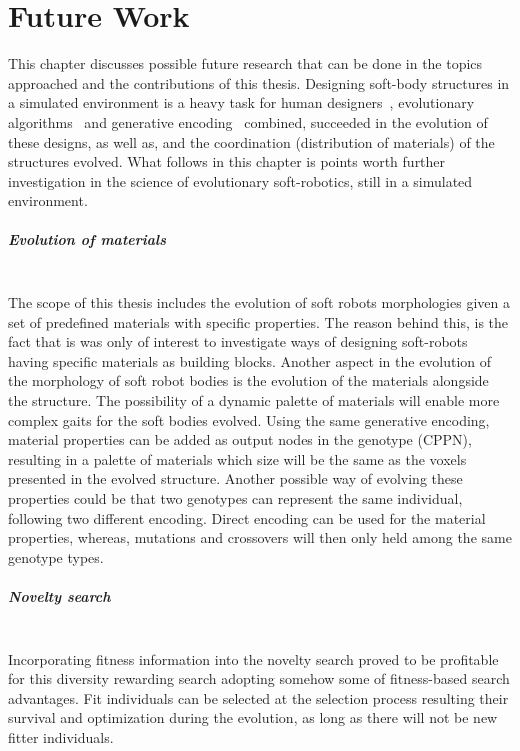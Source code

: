 
\chapter{Future Work} %

\label{Future Work} %


This chapter discusses possible future research that can be done in the topics approached and the contributions of this thesis. Designing soft-body structures in a simulated environment is a heavy task for human designers~\cite{cheney2013unshackling}, evolutionary algorithms~\cite{stanley2002evolving} and generative encoding~\cite{stanley2007compositional} combined, succeeded in the evolution of these designs, as well as, and the coordination (distribution of materials) of the structures evolved. What follows in this chapter is points worth further investigation in the science of evolutionary soft-robotics, still in a simulated environment.

\paragraph*{Evolution of materials}~\\
The scope of this thesis includes the evolution of soft robots morphologies given a set of predefined materials with specific properties. The reason behind this, is the fact that is was only of interest to investigate ways of designing soft-robots having specific materials as building blocks. Another aspect in the evolution of the morphology of soft robot bodies is the evolution of the materials alongside the structure. The possibility of a dynamic palette of materials will enable more complex gaits for the soft bodies evolved. Using the same generative encoding, material properties can be added as output nodes in the genotype (CPPN), resulting in a palette of materials which size will be the same as the voxels presented in the evolved structure. Another possible way of evolving these properties could be that two genotypes can represent the same individual, following two different encoding. Direct encoding can be used for the material properties, whereas, mutations and crossovers will then only held among the same genotype types.

\paragraph*{Novelty search}~\\
Incorporating fitness information into the novelty search proved to be profitable for this diversity rewarding search adopting somehow some of fitness-based search advantages. Fit individuals can be selected at the selection process resulting their survival and optimization during the evolution, as long as there will not be new fitter individuals.

